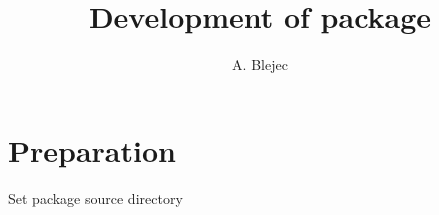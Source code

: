\documentclass[a4paper,12pt]{article}\usepackage[]{graphicx}\usepackage[]{color}
\begin{document}
\title{Development of package }
\author{A. Blejec}
%

\maketitle
\tableofcontents



\clearpage
\section{Preparation}


Set package source directory
\end{document}
